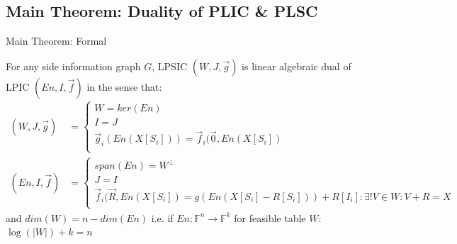 \documentclass[xcolor=dvipsnames, aspectratio=169]{beamer}
\begin{document}
\subsection{Main Theorem: Duality of PLIC \& PLSC}
\begin{frame}{Main Theorem: Formal}
	\begin{theorem}
		For any side information graph $G$, LPSIC $(W, J, \overrightarrow{g})$ is linear algebraic dual of LPIC $(En, I, \overrightarrow{f})$ in the sense that:
		\begin{align*}
			(W, J, \overrightarrow{g}) &= \begin{cases}
				W = ker(En)\\
				I = J \\    
				\overrightarrow{g}_i(En(X[S_i])) = \overrightarrow{f}_i(\overrightarrow{0}, En(X[S_i])\\
			\end{cases} \\
			(En, I, \overrightarrow{f}) &= \begin{cases}
				span(En) = W^{\bot} \\
				J = I \\
				\overrightarrow{f}_i(\overrightarrow{R}, En(X[S_i]) = g(En(X[S_i] - R[S_i])) + R[I_i]: \exists! V \in W: V + R = X \\
			\end{cases}
		\end{align*}
		and $dim(W) = n - dim(En)$ i.e. if $En: \mathbb{F}^n \rightarrow \mathbb{F}^k$ for feasible table $W$: $\log(|W|) + k = n$
	\end{theorem}
\end{frame}
\end{document}
